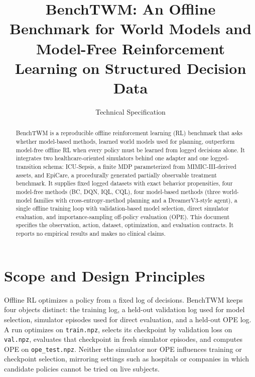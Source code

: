 \documentclass[10pt,twocolumn]{article}
\title{BenchTWM: An Offline Benchmark for World Models and\\
Model-Free Reinforcement Learning on Structured Decision Data}
\author{Technical Specification}
\date{}
\newcommand{\code}[1]{\texttt{#1}}
\begin{document}
\maketitle

\begin{abstract}
BenchTWM is a reproducible offline reinforcement learning (RL) benchmark that asks whether model-based methods, learned world models used for planning, outperform model-free offline RL when every policy must be learned from logged decisions alone. It integrates two healthcare-oriented simulators behind one adapter and one logged-transition schema: ICU-Sepsis, a finite MDP parameterized from MIMIC-III-derived assets, and EpiCare, a procedurally generated partially observable treatment benchmark. It supplies fixed logged datasets with exact behavior propensities, four model-free methods (BC, DQN, IQL, CQL), four model-based methods (three world-model families with cross-entropy-method planning and a DreamerV3-style agent), a single offline training loop with validation-based model selection, direct simulator evaluation, and importance-sampling off-policy evaluation (OPE). This document specifies the observation, action, dataset, optimization, and evaluation contracts. It reports no empirical results and makes no clinical claims.
\end{abstract}

\section{Scope and Design Principles}
\label{sec:scope}

Offline RL optimizes a policy from a fixed log of decisions. BenchTWM keeps four objects distinct: the training log, a held-out validation log used for model selection, simulator episodes used for direct evaluation, and a held-out OPE log. A run optimizes on \code{train.npz}, selects its checkpoint by validation loss on \code{val.npz}, evaluates that checkpoint in fresh simulator episodes, and computes OPE on \code{ope\_test.npz}. Neither the simulator nor OPE influences training or checkpoint selection, mirroring settings such as hospitals or companies in which candidate policies cannot be tried on live subjects.
\end{document}
